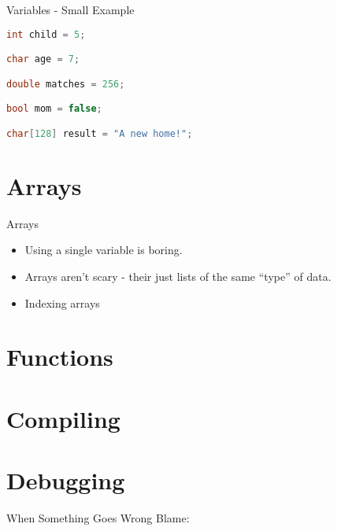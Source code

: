 \documentclass[main.tex]{subfile}
\begin{document}
\begin{frame}[fragile]{Variables - Small Example}
	\begin{lstlisting}[language=c,caption=Example of some variables]
int child = 5;

char age = 7;

double matches = 256;

bool mom = false;

char[128] result = "A new home!";
	\end{lstlisting}		

\end{frame}


\section{Arrays}
\label{sec:arrays}
\begin{frame}{Arrays}
	\begin{itemize}
		\item Using a single variable is boring.
		\item Arrays aren't scary - their just lists of the same ``type'' of data.
		\item Indexing arrays
	\end{itemize}
\end{frame}


\section{Functions} 
\label{sec:functions}


\section{Compiling} 
\label{sec:compiling}




\section{Debugging} 
\label{sec:debugging}

\begin{frame}{When Something Goes Wrong Blame:}

	\begin{itemize}
	\end{itemize}

\end{frame}
\end{document}
